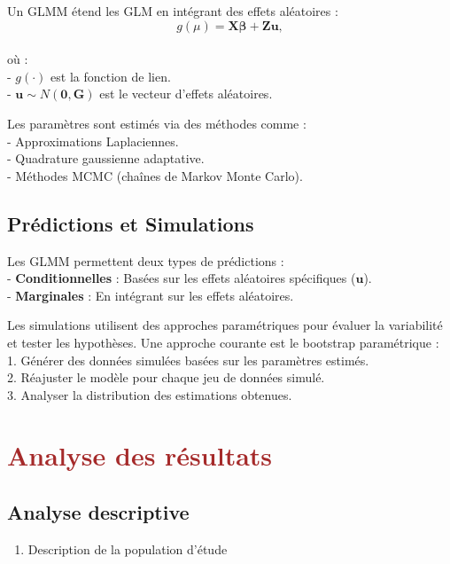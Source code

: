 \documentclass[
]{article}
\providecommand{\tightlist}{%
  \setlength{\itemsep}{0pt}\setlength{\parskip}{0pt}}
\begin{document}
Un GLMM étend les GLM en intégrant des effets aléatoires :\\
\[ g(\mu) = \mathbf{X} \boldsymbol{\beta} + \mathbf{Z} \mathbf{u}, \]\\
où :\\
- \(g(\cdot)\) est la fonction de lien.\\
- \(\mathbf{u} \sim N(\mathbf{0}, \mathbf{G})\) est le vecteur d'effets
aléatoires.

Les paramètres sont estimés via des méthodes comme :\\
- Approximations Laplaciennes.\\
- Quadrature gaussienne adaptative.\\
- Méthodes MCMC (chaînes de Markov Monte Carlo).

\subsection{Prédictions et
Simulations}\label{pruxe9dictions-et-simulations}

Les GLMM permettent deux types de prédictions :\\
- \textbf{Conditionnelles} : Basées sur les effets aléatoires
spécifiques (\(\mathbf{u}\)).\\
- \textbf{Marginales} : En intégrant sur les effets aléatoires.

Les simulations utilisent des approches paramétriques pour évaluer la
variabilité et tester les hypothèses. Une approche courante est le
bootstrap paramétrique :\\
1. Générer des données simulées basées sur les paramètres estimés.\\
2. Réajuster le modèle pour chaque jeu de données simulé.\\
3. Analyser la distribution des estimations obtenues.

\section{\texorpdfstring{\textcolor{brown} {Analyse des résultats}}{}}\label{section-3}

\subsection{Analyse descriptive}\label{analyse-descriptive}

\begin{enumerate}
\def\labelenumi{\arabic{enumi}.}
\tightlist
\item
  Description de la population d'étude
\end{enumerate}
\end{document}
